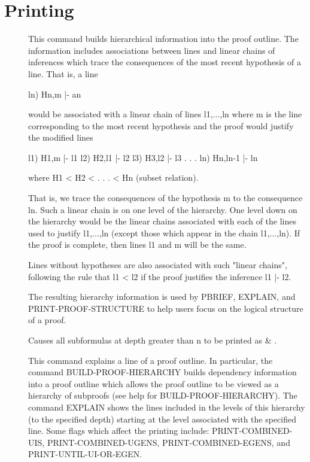 \section{Printing}

\begin{description} 
\item[\parbox{\textwidth}{BUILD-PROOF-HIERARCHY}]  
This command builds hierarchical information into the proof outline.
The information includes associations between lines and linear chains
of inferences which trace the consequences of the most recent hypothesis
of a line.  That is, a line 

ln) Hn,m |- an

would be associated with a linear chain of lines l1,...,ln
where m is the line corresponding to the most recent hypothesis and
the proof would justify the modified lines

l1) H1,m |- l1
l2) H2,l1 |- l2
l3) H3,l2 |- l3  
. . .
ln) Hn,ln-1 |- ln

where H1 < H2 < . . . < Hn (subset relation). 

That is, we trace the consequences of the hypothesis m to the
consequence ln.  Such a linear chain is on one level of the hierarchy.
One level down on the hierarchy would be the linear chains associated
with each of the lines used to justify l1,...,ln (except those which
appear in the chain l1,...,ln).  If the proof is complete,
then lines l1 and m will be the same.

Lines without hypotheses are also associated with such
"linear chains", following the rule that l1 < l2 if
the proof justifies the inference l1 |- l2.

The resulting hierarchy information is used by PBRIEF, EXPLAIN,
and PRINT-PROOF-STRUCTURE to help users focus on the logical
structure of a proof.

\item[\parbox{\textwidth}{DEPTH \textit{num}}]  
Causes all subformulas at depth greater than n to be printed as \& .

\item[\parbox{\textwidth}{EXPLAIN \textit{line} \textit{depth}}]  
This command explains a line of a proof outline.
In particular, the command BUILD-PROOF-HIERARCHY builds
dependency information into a proof outline which allows
the proof outline to be viewed as a hierarchy of subproofs (see
help for BUILD-PROOF-HIERARCHY).  The command EXPLAIN shows
the lines included in the levels of this hierarchy (to the 
specified depth) starting at the level associated with the 
specified line.  Some flags which affect the printing include:
PRINT-COMBINED-UIS, PRINT-COMBINED-UGENS, PRINT-COMBINED-EGENS,
and PRINT-UNTIL-UI-OR-EGEN.


\end{description}
